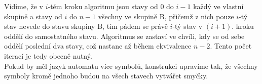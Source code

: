 \documentclass{scrartcl}
\begin{document}
    Vidíme, že v $i$-tém kroku algoritmu jsou stavy od 0 do $i-1$ každý ve vlastní skupině a stavy od $i$ do $n-1$ všechny ve skupině B, přičemž z nich pouze $i$-tý stav nevede do stavu skupiny B, tím pádem se právě $i$-tý stav v $(i+1)$. kroku oddělí do samostatného stavu. Algoritmus se zastaví ve chvíli, kdy se od sebe oddělí poslední dva stavy, což nastane až během ekvivalence $n-2$. Tento počet iterací je tedy obecně nutný. \\

    Pokud by měl jazyk automatu více symbolů, konstrukci upravíme tak, že všechny symboly kromě jednoho budou na všech stavech vytvářet smyčky.
\end{document}
